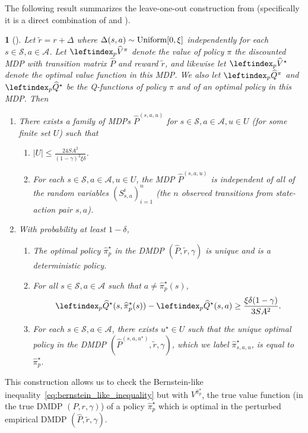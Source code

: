 \documentclass{article}
\theoremstyle{plain}
\newtheorem{thm}{\protect\theoremname}
\theoremstyle{plain}
\theoremstyle{remark}
\theoremstyle{plain}
\theoremstyle{plain}
\providecommand{\theoremname}{Theorem}
\newcommand{\Phat}{\widehat{P}}
\newcommand{\Vhat}{\widehat{V}}
\newcommand{\Qhat}{\widehat{Q}}
\newcommand{\pihstar}{\widehat{\pi}^\star}
\newcommand{\pihat}{\widehat{\pi}}
\newcommand{\A}{\mathcal{A}}
\renewcommand{\S}{\mathcal{S}}
\newcommand{\Vhatpert}{\leftindex_p{\Vhat}}
\newcommand{\Qhatpert}{\leftindex_p{\Qhat}}
\newcommand{\pihatpert}{\pihat^\star_p}
\begin{document}
The following result summarizes the leave-one-out construction from \cite{li_breaking_2020} (specifically it is a direct combination of \cite[Lemma 6]{li_breaking_2020} and \cite[Lemma 4]{li_breaking_2020}).
\begin{thm}[\cite{li_breaking_2020}]
\label{thm:li_LOO_construction}
    Let $\widetilde{r} = r + \Delta$ where $\Delta(s,a) \sim \textnormal{Uniform}[0, \xi]$ independently for each $s \in \S, a \in \A$. Let $\Vhatpert^\pi$ denote the value of policy $\pi$ the discounted MDP with transition matrix $\Phat$ and reward $\widetilde{r}$, and likewise let $\Vhatpert^\star$ denote the optimal value function in this MDP. We also let $\Qhatpert^\pi$ and $\Qhatpert^\star$ be the Q-functions of policy $\pi$ and of an optimal policy in this MDP. Then
    \begin{enumerate}
        \item There exists a family of MDPs $\Phat^{(s,a,u)}$ for $s \in \S, a \in \A, u \in U$ (for some finite set $U$) such that
        \begin{enumerate}
            \item $|U| \leq \frac{24 SA^2}{(1-\gamma)^3 \xi \delta}$.
            \item For each $s \in \S, a \in \A, u \in U$, the MDP $\Phat^{(s,a,u)}$ is independent of all of the random variables $(S^i_{s,a})_{i=1}^n$ (the $n$ observed transitions from state-action pair $s,a$).
        \end{enumerate}
        \item With probability at least $1 - \delta$,
        \begin{enumerate}
            \item The optimal policy $\pihatpert$ in the DMDP $(\Phat, \widetilde{r}, \gamma)$ is unique and is a deterministic policy.
            \item For all $s \in \S, a \in \A$ such that $a \neq \pihatpert(s)$,
            \[
                \Qhatpert^\star(s, \pihatpert(s)) - \Qhatpert^\star(s,a) \geq \frac{\xi \delta (1-\gamma)}{3 S A^2}.
            \]
            \item For each $s \in \S, a \in \A$, there exists $u^\star \in U$ such that the unique optimal policy in the DMDP $(\Phat^{(s,a,u^\star)}, \widetilde{r}, \gamma)$, which we label $\pihstar_{s,a,u}$, is equal to $\pihatpert$.
        \end{enumerate}
    \end{enumerate}
\end{thm}
This construction allows us to check the Bernstein-like inequality~\eqref{eq:bernstein_like_inequality} but with $V^{\pihatpert}$, the true value function (in the true DMDP $(P, r, \gamma)$) of a policy $\pihatpert$ which is optimal in the perturbed empirical DMDP $(\Phat, \widetilde{r}, \gamma)$.
\end{document}
